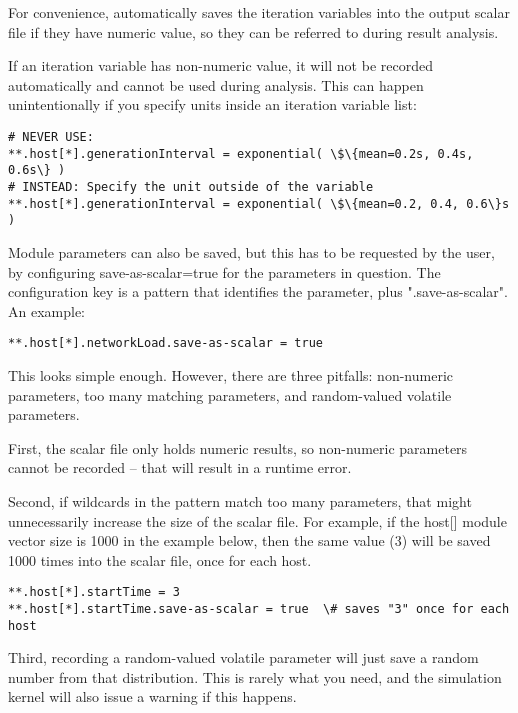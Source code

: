 For convenience, {\opp} automatically saves the iteration variables
into the output scalar file if they have numeric value, so they can
be referred to during result analysis.

\begin{warning}
    If an iteration variable has non-numeric value, it will not be recorded
    automatically and cannot be used during analysis. This can happen
    unintentionally if you specify units inside an iteration variable list:
\begin{Verbatim}[commandchars=\\\{\}]
# NEVER USE:
**.host[*].generationInterval = exponential( \$\{mean=0.2s, 0.4s, 0.6s\} )
# INSTEAD: Specify the unit outside of the variable
**.host[*].generationInterval = exponential( \$\{mean=0.2, 0.4, 0.6\}s )
\end{Verbatim}
\end{warning}

Module parameters can also be saved, but this has to be
requested by the user, by configuring save-as-scalar=true for the
parameters in question. The configuration key is a pattern that
identifies the parameter, plus ".save-as-scalar". An example:

\begin{Verbatim}[commandchars=\\\{\}]
**.host[*].networkLoad.save-as-scalar = true
\end{Verbatim}

This looks simple enough. However, there are three pitfalls:
non-numeric parameters, too many matching parameters, and
random-valued volatile parameters.

First, the scalar file only holds numeric results, so non-numeric
parameters cannot be recorded -- that will result in a runtime
error.

Second, if wildcards in the pattern match too many parameters, that
might unnecessarily increase the size of the scalar file. For example,
if the host[] module vector size is 1000 in the example below, then the
same value (3) will be saved 1000 times into the scalar file, once for
each host.

\begin{Verbatim}[commandchars=\\\{\}]
**.host[*].startTime = 3
**.host[*].startTime.save-as-scalar = true  \# saves "3" once for each host
\end{Verbatim}

Third, recording a random-valued volatile parameter will just save a
random number from that distribution. This is rarely what you need, and
the simulation kernel will also issue a warning if this happens.

